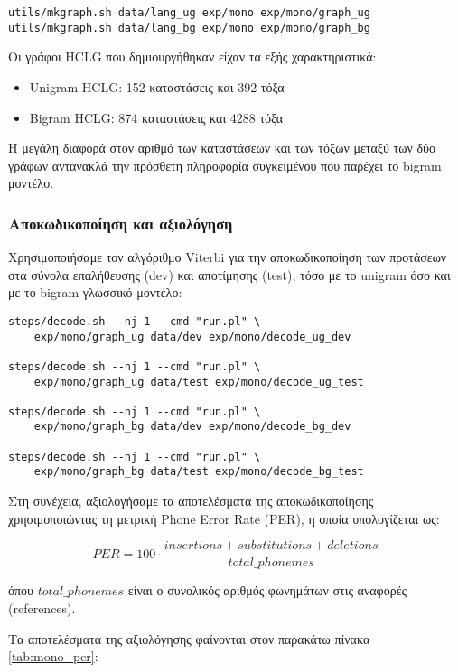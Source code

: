 \documentclass[a4paper,12pt]{article}
\begin{document}
\begin{lstlisting}
utils/mkgraph.sh data/lang_ug exp/mono exp/mono/graph_ug
utils/mkgraph.sh data/lang_bg exp/mono exp/mono/graph_bg
\end{lstlisting}

Οι γράφοι HCLG που δημιουργήθηκαν είχαν τα εξής χαρακτηριστικά:
\begin{itemize}
    \item Unigram HCLG: 152 καταστάσεις και 392 τόξα
    \item Bigram HCLG: 874 καταστάσεις και 4288 τόξα
\end{itemize}

Η μεγάλη διαφορά στον αριθμό των καταστάσεων και των τόξων μεταξύ των δύο γράφων αντανακλά την πρόσθετη πληροφορία συγκειμένου που παρέχει το bigram μοντέλο.

\subsubsection{Αποκωδικοποίηση και αξιολόγηση}

Χρησιμοποιήσαμε τον αλγόριθμο Viterbi για την αποκωδικοποίηση των προτάσεων στα σύνολα επαλήθευσης (dev) και αποτίμησης (test), τόσο με το unigram όσο και με το bigram γλωσσικό μοντέλο:

\begin{lstlisting}
steps/decode.sh --nj 1 --cmd "run.pl" \
    exp/mono/graph_ug data/dev exp/mono/decode_ug_dev
    
steps/decode.sh --nj 1 --cmd "run.pl" \
    exp/mono/graph_ug data/test exp/mono/decode_ug_test
    
steps/decode.sh --nj 1 --cmd "run.pl" \
    exp/mono/graph_bg data/dev exp/mono/decode_bg_dev
    
steps/decode.sh --nj 1 --cmd "run.pl" \
    exp/mono/graph_bg data/test exp/mono/decode_bg_test
\end{lstlisting}

Στη συνέχεια, αξιολογήσαμε τα αποτελέσματα της αποκωδικοποίησης χρησιμοποιώντας τη μετρική Phone Error Rate (PER), η οποία υπολογίζεται ως:

\begin{equation}
PER = 100 \cdot \frac{insertions + substitutions + deletions}{total\_phonemes}
\end{equation}

όπου $total\_phonemes$ είναι ο συνολικός αριθμός φωνημάτων στις αναφορές (references).

Τα αποτελέσματα της αξιολόγησης φαίνονται στον παρακάτω πίνακα \ref{tab:mono_per}:
\end{document}
